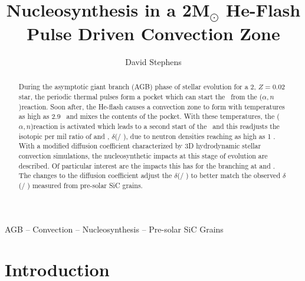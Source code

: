 \documentclass[fleqn,usenatbib]{mnras}
\title[Nucleosynthesis in a 2\Msun He-Flash Pulse Driven Convection Zone]{Nucleosynthesis in a 2M$_{\odot}$ He-Flash Pulse Driven Convection Zone}
\author[D. Stephens]{
David Stephens}
\begin{document}
\label{firstpage}
\pagerange{\pageref{firstpage}--\pageref{lastpage}}
\maketitle

\begin{abstract}
During the asymptotic giant branch (AGB) phase of stellar evolution for a 2\Msun, $Z=0.02$ star, the periodic thermal pulses form a \carbon[13] pocket which can start the \spr~from the \carbon[13]($\alpha,n$)\oxygen[16] reaction. Soon after, the He-flash causes a convection zone to form with temperatures as high as 2.9 \K~and mixes the contents of the \carbon[13] pocket. With these temperatures, the \neon[22]($\alpha,n$)\magnesium[25] reaction is activated which leads to a second start of the \spr~and this readjusts the isotopic per mil ratio of \zirconium[96] and \zirconium[94], $\delta$(\zirconium[96] / \zirconium[94]), due to neutron densities reaching as high as 1 . With a modified diffusion coefficient characterized by 3D hydrodynamic stellar convection simulations, the nucleosynthetic impacts at this stage of evolution are described. Of particular interest are the impacts this has for the branching at \zirconium[95] and \iodine[128]. The changes to the diffusion coefficient adjust the $\delta$(\zirconium[96] / \zirconium[94]) to better match the observed $\delta$(\zirconium[96] / \zirconium[94]) measured from pre-solar SiC grains.
\end{abstract}

\begin{keywords}
AGB -- Convection -- Nucleosynthesis -- Pre-solar SiC Grains
\end{keywords}



\section{Introduction}
\end{document}
